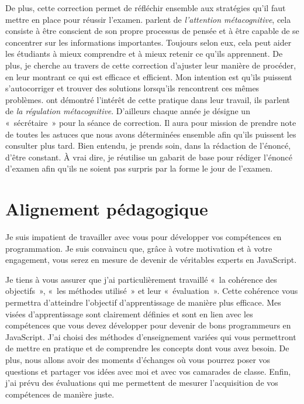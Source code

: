 De plus, cette correction permet de réfléchir ensemble aux stratégies qu'il faut mettre en place pour réussir l'examen. \citet{winne1998studying} parlent de \emph{l'attention métacognitive}, cela consiste à être conscient de son propre processus de pensée et à être capable de se concentrer sur les informations importantes. Toujours selon eux, cela peut aider les étudiants à mieux comprendre et à mieux retenir ce qu'ils apprennent. De plus, je cherche au travers de cette correction d'ajuster leur manière  de procéder, en leur montrant ce qui est efficace et efficient. Mon intention est qu'ils puissent s'autocorriger et trouver des solutions lorsqu'ils rencontrent ces mêmes problèmes. \citet{zimmerman1986becoming} ont démontré l'intérêt de cette pratique dans leur travail, ils parlent de \emph{la régulation métacognitive}.
D'ailleurs chaque année je désigne un «~sécrétaire~» pour la séance de correction. Il aura pour mission de prendre note de toutes les astuces que nous avons déterminées ensemble afin qu’ils puissent les consulter plus tard. Bien entendu, je prends soin, dans la rédaction de l'énoncé, d'être constant. À vrai dire, je réutilise un gabarit de base pour rédiger l'énoncé d’examen afin qu’ils ne soient pas surpris par la forme le jour de l'examen.


\clearpage
\section{Alignement pédagogique}

Je suis impatient de travailler avec vous pour développer vos compétences en programmation. Je suis convaincu que, grâce à votre motivation et à votre engagement, vous serez en mesure de devenir de véritables experts en JavaScript.

Je tiens à vous assurer que j'ai particulièrement travaillé «~la cohérence des objectifs~», «~les méthodes utilisé~» et leur «~évaluation~». Cette cohérence vous permettra d'atteindre l'objectif d'apprentissage de manière plus efficace. Mes visées d'apprentissage sont clairement définies et sont en lien avec les compétences que vous devez développer pour devenir de bons programmeurs en JavaScript. J'ai choisi des méthodes d'enseignement variées qui vous permettront de mettre en pratique et de comprendre les concepts dont vous avez besoin. De plus, nous allons avoir des moments d'échanges où vous pourrez poser vos questions et partager vos idées avec moi et avec vos camarades de classe. Enfin, j'ai prévu des évaluations qui me permettent de mesurer l'acquisition de vos compétences de manière juste.

